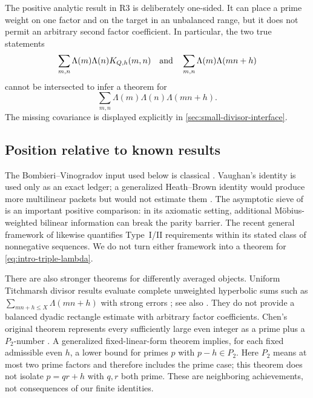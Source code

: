 The positive analytic result in R3 is deliberately one-sided.  It can place
a prime weight on one factor and on the target in an unbalanced range, but it
does not permit an arbitrary second factor coefficient.  In particular, the
two true statements
\[
 \sum_{m,n}\Lambda(m)\Lambda(n)K_{Q,h}(m,n)
 \quad\hbox{and}\quad
 \sum_{m,n}\Lambda(m)\Lambda(mn+h)
\]
cannot be intersected to infer a theorem for
\begin{equation}\label{eq:intro-triple-lambda}
 \sum_{m,n}\Lambda(m)\Lambda(n)\Lambda(mn+h).
\end{equation}
The missing covariance is displayed explicitly in
\cref{sec:small-divisor-interface}.

\subsection{Position relative to known results}

The Bombieri--Vinogradov input used below is classical
\citep{Bombieri1965,Vinogradov1965,IwaniecKowalski2004}.  Vaughan's identity
is used only as an exact ledger; a generalized Heath--Brown identity would
produce more multilinear packets but would not estimate them
\citep{Vaughan1977,HeathBrownVaughan1982}.  The asymptotic sieve of
\citet{FriedlanderIwaniec1998} is an important positive comparison: in its
axiomatic setting, additional M\"obius-weighted bilinear information can
break the parity barrier.  The recent general framework of
\citet{FordMaynard2024} likewise quantifies Type~I/II requirements within
its stated class of nonnegative sequences.  We do not turn either framework
into a theorem for \eqref{eq:intro-triple-lambda}.

There are also stronger theorems for differently averaged objects.  Uniform
Titchmarsh divisor results evaluate complete unweighted hyperbolic sums such
as $\sum_{mn+h\le X}\Lambda(mn+h)$ with strong errors
\citep[Theorem~1.1]{AssingBlomerLi2021}; see also \citet{Fouvry1985}.
They do not provide a balanced dyadic rectangle estimate with arbitrary
factor coefficients.  Chen's original theorem represents every sufficiently
large even integer as a prime plus a $P_2$-number \citep{Chen1973}.  A
generalized fixed-linear-form theorem
\citep[Theorem~25.11]{FriedlanderIwaniec2010} implies, for each fixed
admissible even $h$, a lower bound for primes $p$ with $p-h\in P_2$.
Here $P_2$ means at most two prime factors and therefore includes the prime
case; this theorem does not isolate $p=qr+h$ with $q,r$ both prime.  These
are neighboring achievements, not consequences of our finite identities.

